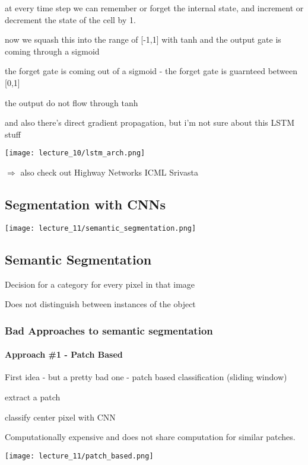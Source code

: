 at every time step we can remember or forget the internal state, and increment or decrement the state of the cell by 1.

now we squash this into the range of [-1,1] with tanh and the output gate is coming through a sigmoid

the forget gate is coming out of a sigmoid - the forget gate is guarnteed between [0,1]

the output do not flow through tanh

and also there's direct gradient propagation, but i'm not sure about this LSTM stuff

\texttt{[image: lecture\_10/lstm\_arch.png]}

$\Rightarrow$ also check out Highway Networks ICML Srivasta

\subsection{Segmentation with CNNs}

\texttt{[image: lecture\_11/semantic\_segmentation.png]}

\subsection{Semantic Segmentation}

Decision for a category for every pixel in that image

Does not distinguish between instances of the object

\subsubsection{Bad Approaches to semantic segmentation}

\paragraph{Approach \#1 - Patch Based}

First idea - but a pretty bad one - patch based classification (sliding window)

extract a patch

classify center pixel with CNN

Computationally expensive and does not share computation for similar patches.

\texttt{[image: lecture\_11/patch\_based.png]}

